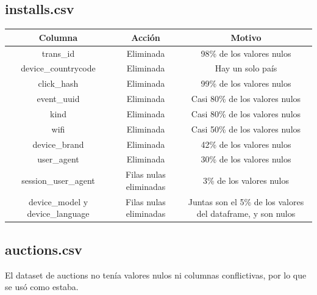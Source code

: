 \documentclass[a4paper, 12pt]{article}
\begin{document}
\subsection{installs.csv}
\FloatBarrier
\begin{center}
	\begin{adjustbox}{width=1\textwidth}
        \begin{tabular}{ |c|c|c| }
          \hline
          Columna & Acción & Motivo \\
          \hline\hline
          trans\_id & Eliminada & 98\% de los valores nulos \\
          \hline
          device\_countrycode & Eliminada & Hay un solo país \\
          \hline
          click\_hash & Eliminada & 99\% de los valores nulos \\
          \hline
          event\_uuid & Eliminada & Casi 80\% de los valores nulos \\
          \hline
          kind & Eliminada & Casi 80\% de los valores nulos \\
          \hline
          wifi & Eliminada & Casi 50\% de los valores nulos \\
          \hline
          device\_brand & Eliminada & 42\% de los valores nulos \\
          \hline
          user\_agent & Eliminada & 30\% de los valores nulos \\
          \hline
          session\_user\_agent & Filas nulas eliminadas & 3\% de los valores nulos \\
          \hline
          device\_model y device\_language & Filas nulas eliminadas & Juntas son el 5\% de los valores del dataframe, y son nulos \\
          \hline
        \end{tabular}
	\end{adjustbox}
\end{center}
\FloatBarrier

\subsection{auctions.csv}
    El dataset de auctions no tenía valores nulos ni columnas conflictivas, por lo que se usó como estaba.
\end{document}

